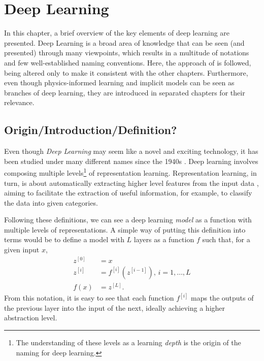 \chapter{Deep Learning}\label{cap:deep-learning}

In this chapter, a brief overview of the key elements of deep learning are presented.
Deep Learning is a broad area of knowledge that can be seen (and presented) through many viewpoints, which results in a multitude of notations and few well-established naming conventions.
Here, the approach of \textcite{goodfellow_deep_2016} is followed, being altered only to make it consistent with the other chapters.
Furthermore, even though physics-informed learning and implicit models can be seen as branches of deep learning, they are introduced in separated chapters for their relevance.

\section{Origin/Introduction/Definition?}

Even though \textit{Deep Learning} may seem like a novel and exciting technology, it has been studied under many different names since the 1940s \cite{goodfellow_deep_2016}.
Deep learning involves composing multiple levels\footnote{The understanding of these levels as a learning \textit{depth} is the origin of the naming for deep learning.} of representation learning.
Representation learning, in turn, is about automatically extracting higher level features from the input data \cite{lecun_deep_2015,bengio_representation_2013}, aiming to facilitate the extraction of useful information, for example, to classify the data into given categories.

Following these definitions, we can see a deep learning \textit{model} as a function with multiple levels of representations.
A simple way of putting this definition into terms would be to define a model with $L$ layers as a function $f$ such that, for a given input $x$,
\begin{align*}
    z^{[0]} &= x \\
    z^{[i]} &= f^{[i]}(z^{[i-1]}),\,i=1,\ldots,L \\
    f(x) &= z^{[L]}
.\end{align*}
From this notation, it is easy to see that each function $f^{[i]}$ maps the outputs of the previous layer into the input of the next, ideally achieving a higher abstraction level.

